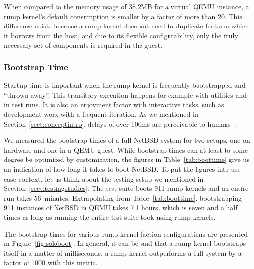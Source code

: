When compared to the memory usage of 38.2MB for a virtual QEMU
instance, a rump kernel's default consumption is smaller by a factor of
more than 20.  This difference exists because a rump kernel does not need to
duplicate features which it borrows from the host, and due to its
flexible configurability, only the truly necessary set of components
is required in the guest.

\subsubsection{Bootstrap Time}

Startup time is important when the rump kernel is frequently
bootstrapped and ``thrown away''.  This transitory execution happens for example with
utilities and in test runs.  It is also an enjoyment factor with
interactive tasks, such as development work with a frequent iteration.
As we mentioned in Section~\ref{sect:conceptintro}, delays of over
100ms are perceivable to humans~\cite{miller:100ms}.

We measured the bootstrap times of a full NetBSD system for two setups, one on hardware and
one in a QEMU guest.  While bootstrap times can at least to some
degree be optimized by customization, the figures in
Table~\ref{tab:boottime} give us an indication of how long it takes to
boot NetBSD.  To put the figures into use case context, let
us think about the testing setup we mentioned in
Section~\ref{sect:testingstudies}.  The test suite boots 911 rump
kernels and an entire run takes 56~minutes.  Extrapolating from
Table~\ref{tab:boottime}, bootstrapping 911 instances of NetBSD in
QEMU takes 7.1 hours, which is seven and a half times as long as
running the entire test suite took using rump kernels.

The bootstrap times for various rump kernel faction configurations
are presented in Figure~\ref{fig:soloboot}.  In general, it can be
said that a rump kernel bootstraps itself in a matter of milliseconds,
\ie a rump kernel outperforms a full system by a factor of 1000 with
this metric.

